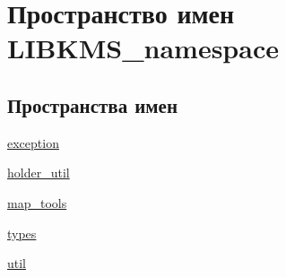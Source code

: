 \hypertarget{namespaceLIBKMS__namespace}{\section{Пространство имен L\-I\-B\-K\-M\-S\-\_\-namespace}
\label{namespaceLIBKMS__namespace}
}
\subsection*{Пространства имен}
\begin{DoxyCompactItemize}
\item 
\hyperlink{namespaceLIBKMS__namespace_1_1exception}{exception}
\item 
\hyperlink{namespaceLIBKMS__namespace_1_1holder__util}{holder\-\_\-util}
\item 
\hyperlink{namespaceLIBKMS__namespace_1_1map__tools}{map\-\_\-tools}
\item 
\hyperlink{namespaceLIBKMS__namespace_1_1types}{types}
\item 
\hyperlink{namespaceLIBKMS__namespace_1_1util}{util}
\end{DoxyCompactItemize}
